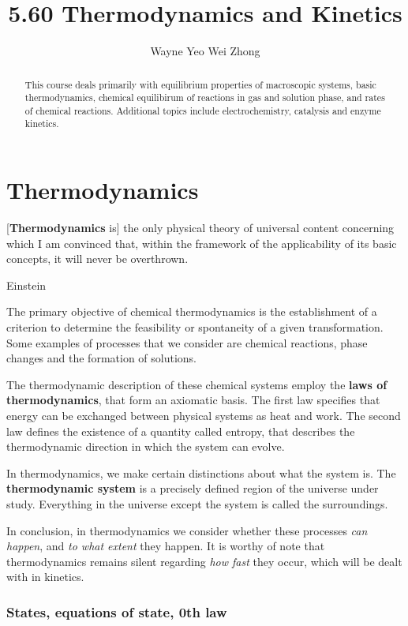\documentclass{article}
\title{5.60 Thermodynamics and Kinetics}
\author{Wayne Yeo Wei Zhong}
\numberwithin{theorem}{section}
\numberwithin{corollary}{section}
\numberwithin{postulate}{section}
\numberwithin{lemma}{section}
\numberwithin{definition}{section}
\begin{document}
\maketitle

\begin{abstract}
  This course deals primarily with equilibrium properties of macroscopic
  systems, basic thermodynamics, chemical equilibirum of reactions in gas and
  solution phase, and rates of chemical reactions. Additional topics include
  electrochemistry, catalysis and enzyme kinetics.
\end{abstract}

\tableofcontents
\newpage

\part{Thermodynamics}

\epigraph{[\textbf{Thermodynamics} is] the only physical theory of universal
content concerning which I am convinced that, within the framework of the
applicability of its basic concepts, it will never be overthrown.}{Einstein}

The primary objective of chemical thermodynamics is the establishment of a
criterion to determine the feasibility or spontaneity of a given
transformation. Some examples of processes that we consider are chemical
reactions, phase changes and the formation of solutions. 

The thermodynamic description of these chemical systems employ the \textbf{laws
of thermodynamics}, that form an axiomatic basis. The first law specifies that
energy can be exchanged between physical systems as heat and work.
The second law defines the existence of a quantity called entropy, that
describes the thermodynamic direction in which the system can evolve.

In thermodynamics, we make certain distinctions about what the system is. The
\textbf{thermodynamic system} is a precisely defined region of the universe
under study. Everything in the universe except the system is called the
surroundings.

In conclusion, in thermodynamics we consider whether these processes \textit{can
happen}, and \textit{to what extent} they happen. It is worthy of note that
thermodynamics remains silent regarding \textit{how fast} they occur, which will
be dealt with in kinetics.

\setcounter{section}{0}
\section{States, equations of state, 0th law}
\end{document}

